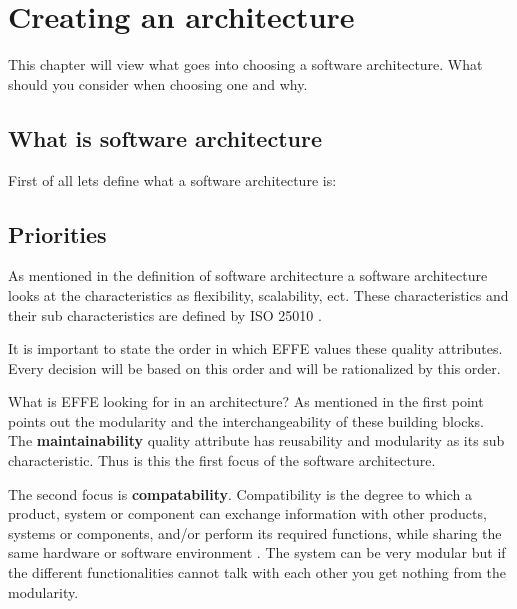 \chapter{Creating an architecture}

This chapter will view what goes into choosing a software architecture. What should you consider when choosing one and why.

\section{What is software architecture}
\label{sec:WhatIsSoftwareArchitecture}

First of all lets define what a software architecture is:


\section{Priorities}

As mentioned in the definition of software architecture  a software architecture looks at the characteristics as flexibility, scalability, ect. These characteristics and their sub characteristics are defined by ISO 25010 \cite{iso25010}.

It is important to state the order in which EFFE values these quality attributes. Every decision will be based on this order and will be rationalized by this order.

What is EFFE looking for in an architecture? As mentioned in  the first point points out the modularity and the interchangeability of these building blocks. The \textbf{maintainability} quality attribute has reusability and modularity as its sub characteristic. Thus is this the first focus of the software architecture.

The second focus is \textbf{compatability}. Compatibility is the degree to which a product, system or component can exchange information with other products, systems or components, and/or perform its required functions, while sharing the same hardware or software environment \cite{iso25010}. The system can be very modular but if the different functionalities cannot talk with each other you get nothing from the modularity.

